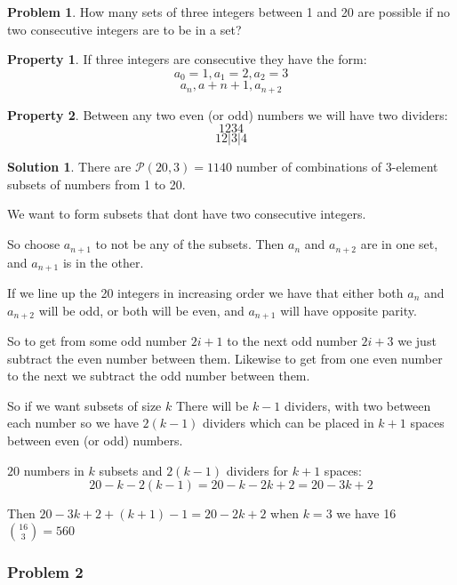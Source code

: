 \documentclass[10pt,a4paper,titlepage,twoside,draft]{article}
\theoremstyle{plain}
\theoremstyle{definition}
\newtheorem*{prob}{Problem}
\newtheorem*{sol}{Solution}
\newtheorem{prot}{Property}
\theoremstyle{remark}
\begin{document}
\begin{prob}
   How many sets of three integers between 1 and 20 are possible if no two consecutive integers are to be in a set?
\end{prob}
    
\medskip    

\begin{prot}  
If three integers are consecutive they have the form: 
\[a_{0}=1,a_{1}=2,a_{2}=3\] 
\[a_{n},a+{n+1},a_{n+2}\] 
\end{prot}

\medskip

\begin{prot} 
Between any two even (or odd) numbers we will have two dividers:      
\[1  2  3  4\]
\[1  2 | 3 | 4 \]
\end{prot}

\medskip

\begin{sol}    
There are $\mathcal{P}(20,3) = 1140$ number of combinations of 3-element subsets of numbers from 1 to 20. 

We want to form subsets that dont have two consecutive integers.
          
So choose $a_{n+1}$ to not be any of the subsets. 
Then $a_{n}$ and $a_{n+2}$ are in one set, and $a_{n+1}$ is in the other. 
         
If we line up the 20 integers in increasing order we have that either both $a_{n}$ and $a_{n+2}$ will be odd, or both will be even, and $a_{n+1}$ will have opposite parity. 
         
So to get from some odd number $2i+1$ to the next odd number $2i+3$ we just subtract the even number between them. Likewise to get from one even number to the next we subtract the odd number between them. 
               
So if we want subsets of size $k$ There will be $k-1$ dividers, with two between each number so we have $2(k-1)$ dividers which can be placed in $k+1$ spaces between even (or odd) numbers. 
         
$20$ numbers in $k$ subsets and $2(k-1)$ dividers for $k+1$ spaces:
\[20-k-2(k-1) = 20 - k -2k+2 = 20 - 3k + 2\]
         
Then $20-3k+2 + (k+1) - 1 = 20-2k+2$ when $k=3$ we have 16 $\binom{16}{3} = 560$
\end{sol}
    

\subsubsection{Problem 2}
\end{document}
